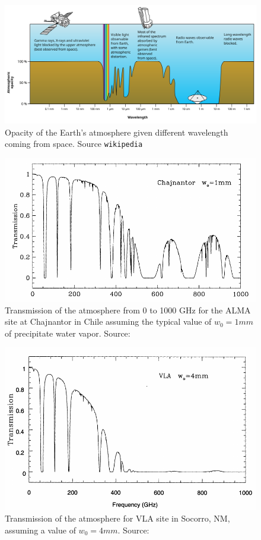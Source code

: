 \documentclass[11pt]{article}
\begin{document}
\begin{figure}[htbp]
\includegraphics[width=\textwidth]{images/Atmospheric_electromagnetic_opacity}
\caption{Opacity of the Earth's atmosphere given different wavelength coming from space. Source \texttt{wikipedia}}
\label{fig:atmospheric-opacity}
\end{figure}

\begin{figure}[htbp]
\includegraphics[width=\textwidth]{images/chajnantor-atm-transmission}
\caption{Transmission of the atmosphere from 0 to 1000 GHz for the ALMA site at Chajnantor in Chile assuming the typical value of $w_0 = 1 mm$ of precipitate water vapor. Source: \cite{taylor99}}
\label{fig:chaj-atm-tx}
\end{figure}

\begin{figure}[ht]
\includegraphics[width=\textwidth]{images/vla-atm-transmission}
\caption{Transmission of the atmosphere for VLA site in Socorro, NM, assuming a value of $w_0 = 4 mm$. Source: \cite{taylor99}}
\label{fig:vla-atm-tx}
\end{figure}
\end{document}
